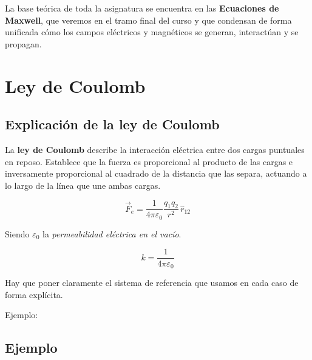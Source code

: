 \documentclass[a4paper,12pt]{article}
\begin{document}
La base teórica de toda la asignatura se encuentra en las \textbf{Ecuaciones de Maxwell}, que veremos en el tramo final del curso y que condensan de forma unificada cómo los campos eléctricos y magnéticos se generan, interactúan y se propagan.

\newpage

\section{Ley de Coulomb}

\subsection*{Explicación de la ley de Coulomb}

La \textbf{ley de Coulomb} describe la interacción eléctrica entre dos cargas puntuales en reposo. 
Establece que la fuerza es proporcional al producto de las cargas e inversamente proporcional al cuadrado de la distancia que las separa, 
actuando a lo largo de la línea que une ambas cargas.

\[
\vec{F}_e = \frac{1}{4\pi\varepsilon_0} \frac{q_1 q_2}{r^2} \, \hat{r}_{12}
\]

Siendo $\varepsilon_0$ la \textit{permeabilidad eléctrica en el vacío}.

\[
k = \frac{1}{4\pi\varepsilon_0}
\]

Hay que poner claramente el sistema de referencia que usamos en cada caso de forma explícita.  

Ejemplo:

\subsection*{Ejemplo}

\begin{center}
\end{center}
\end{document}

